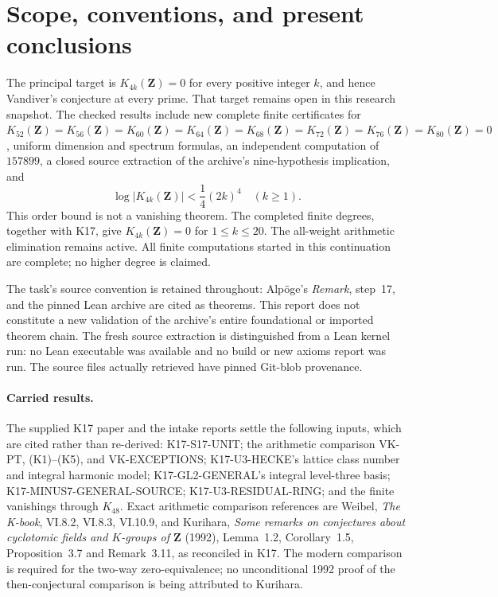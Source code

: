 \section{Scope, conventions, and present conclusions}

The principal target is $K_{4k}(\mathbf Z)=0$ for every positive
integer $k$, and hence Vandiver's conjecture at every prime.
That target remains open in this research snapshot.
The checked results include new complete finite certificates for
$K_{52}(\mathbf Z)=K_{56}(\mathbf Z)=K_{60}(\mathbf Z)=K_{64}(\mathbf Z)=K_{68}(\mathbf Z)=K_{72}(\mathbf Z)=K_{76}(\mathbf Z)=K_{80}(\mathbf Z)=0$, uniform dimension and
spectrum formulas, an independent computation of $157899$, a closed
source extraction of the archive's nine-hypothesis implication, and
\[
 \boxed{\ \log|K_{4k}(\mathbf Z)|<\frac14(2k)^4\quad(k\ge1).\ }
\]
This order bound is not a vanishing theorem. The completed finite
degrees, together with K17, give $K_{4k}(\mathbf Z)=0$ for
$1\le k\le20$. The all-weight arithmetic elimination remains
active. All finite computations started in this continuation are complete;
no higher degree is claimed.

The task's source convention is retained throughout: Alp\"oge's
\emph{Remark}, step~17, and the pinned Lean archive are cited as
theorems. This report does not constitute a new validation of the
archive's entire foundational or imported theorem chain. The fresh
source extraction is distinguished from a Lean kernel run: no Lean
executable was available and no build or new axioms report was run.
The source files actually retrieved have pinned Git-blob provenance.

\paragraph{Carried results.}
The supplied K17 paper and the intake reports settle the following
inputs, which are cited rather than re-derived:
K17-S17-UNIT; the arithmetic comparison VK-PT, (K1)--(K5), and
VK-EXCEPTIONS; K17-U3-HECKE's lattice class number and integral
harmonic model; K17-GL2-GENERAL's integral level-three basis;
K17-MINUS7-GENERAL-SOURCE; K17-U3-RESIDUAL-RING; and the finite
vanishings through $K_{48}$. Exact arithmetic comparison references
are Weibel, \emph{The K-book}, VI.8.2, VI.8.3, VI.10.9, and
Kurihara, \emph{Some remarks on conjectures about cyclotomic fields
and $K$-groups of $\mathbf Z$} (1992), Lemma~1.2, Corollary~1.5,
Proposition~3.7 and Remark~3.11, as reconciled in K17.
The modern comparison is required for the two-way zero-equivalence;
no unconditional 1992 proof of the then-conjectural comparison is
being attributed to Kurihara.

